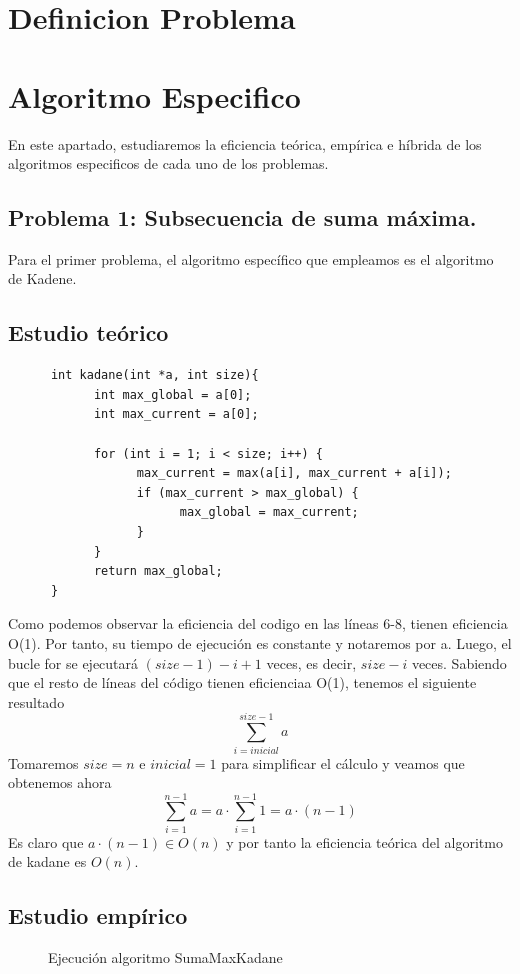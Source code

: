 \documentclass[11pt,openany]{book}
\begin{document}
\chapter{Definicion Problema}
\chapter{Algoritmo Especifico}
En este apartado, estudiaremos la eficiencia teórica, empírica e híbrida de los algoritmos especificos
de cada uno de los problemas.
\section{Problema 1: Subsecuencia de suma máxima.}
Para el primer problema, el algoritmo específico que empleamos es el algoritmo de Kadene.
\section*{Estudio teórico}
\begin{lstlisting}
      int kadane(int *a, int size){
            int max_global = a[0];
            int max_current = a[0];

            for (int i = 1; i < size; i++) {
                  max_current = max(a[i], max_current + a[i]);
                  if (max_current > max_global) {
                        max_global = max_current;
                  }
            }
            return max_global;
      }
\end{lstlisting}
Como podemos observar la eficiencia del codigo en las líneas 6-8, tienen eficiencia O(1). Por tanto,
su tiempo de ejecución es constante y notaremos por a. Luego, el bucle for se ejecutará  $(size-1)-i+1 $ 
veces, es decir, $size-i$ veces. Sabiendo que el resto de líneas del código tienen eficienciaa O(1), tenemos
el siguiente resultado
\begin{equation*}
      \sum_{i=inicial}^{size-1} a
  \end{equation*}
  Tomaremos $size =  n$ e $inicial = 1$ para simplificar el cálculo y veamos que obtenemos ahora
  \begin{equation*}
          \sum_{i=1}^{n-1} a = a \cdot \sum_{i=1}^{n-1} 1= a \cdot (n-1)
      \end{equation*}
  Es claro que $a \cdot (n-1) \in O(n)$ y por tanto la eficiencia teórica del algoritmo de kadane es $O(n)$.
  \section*{Estudio empírico}
  \begin{figure}[h]
        \begin{minipage}{0.5\textwidth}
            \centering
            \caption{Ejecución algoritmo SumaMaxKadane}
            \label{fig:SumaMaxKadane}
        \end{minipage}
  \end{figure}
\end{document}
